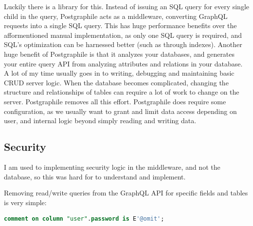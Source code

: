 \documentclass{l4proj}
\begin{document}
Luckily there is a library for this. Instead of issuing an SQL query for every single child in the query, Postgraphile acts as a middleware, converting GraphQL requests into a single SQL query. This has huge performance benefits over the afformentioned manual implementation, as only one SQL query is required, and SQL's optimization can be harnessed better (such as through indexes). Another huge benefit of Postgraphile is that it analyzes your databases, and generates your entire query API from analyzing attributes and relations in your database. A lot of my time usually goes in to writing, debugging and maintaining basic CRUD server logic. When the database becomes complicated, changing the structure and relationships of tables can require a lot of work to change on the server. Postgraphile removes all this effort. Postgraphile does require some configuration, as we usually want to grant and limit data access depending on user, and internal logic beyond simply reading and writing data.


\subsection{Security}
I am used to implementing security logic in the middleware, and not the database, so this was hard for to understand and implement. 

Removing read/write queries from the GraphQL API for specific fields and tables is very simple:

\begin{lstlisting}[language=SQL, caption={This comment tells Postgraphile to omit password fields}, label=lst:callahan]
comment on column "user".password is E'@omit';
\end{lstlisting}
\end{document}
